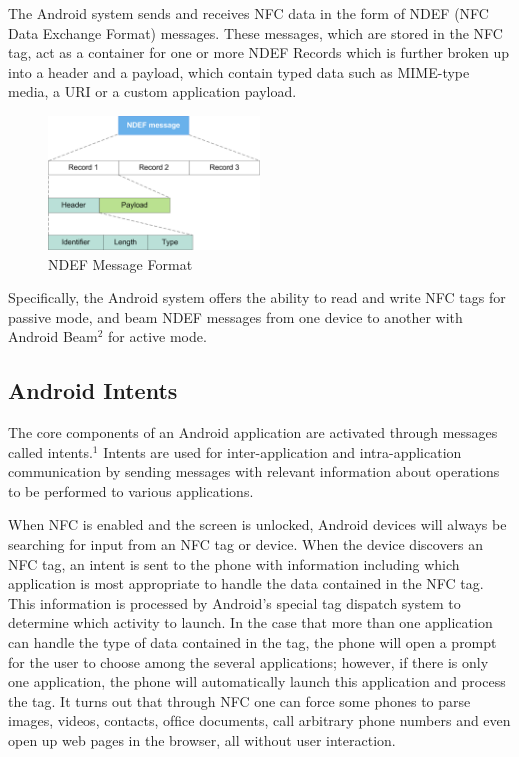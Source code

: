 \documentclass[12pt]{article}
\begin{document}
The Android system sends and receives NFC data in the form of NDEF (NFC Data Exchange Format) messages. These messages, which are stored in the NFC tag, act as a container for one or more NDEF Records which is further broken up into a header and a payload, which contain typed data such as MIME-type media, a URI or a custom application payload.

\begin{figure}[h!]
	\centering
		\includegraphics[width=0.5\textwidth]{NDEF_Format.png}
	\caption{NDEF Message Format}
\end{figure}


Specifically, the Android system offers the ability to read and write NFC tags for passive mode, and beam NDEF messages from one device to another with Android Beam$^{2}$ for active mode. 

\subsection{Android Intents}
The core components of an Android application are activated through messages called intents.$^{1}$ Intents are used for inter-application and intra-application communication by sending messages with relevant information about operations to be performed to various applications.  

When NFC is enabled and the screen is unlocked, Android devices will always be searching for input from an NFC tag or device. When the device discovers an NFC tag, an intent is sent to the phone with information including which application is most appropriate to handle the data contained in the NFC tag. This information is processed by Android's special tag dispatch system to determine which activity to launch. In the case that more than one application can handle the type of data contained in the tag, the phone will open a prompt for the user to choose among the several applications; however, if there is only one application, the phone will automatically launch this application and process the tag. It turns out that through NFC one can force some phones to parse images, videos, contacts, ofﬁce documents, call arbitrary phone numbers and even open up web pages in the browser, all without user interaction.  
\end{document}
